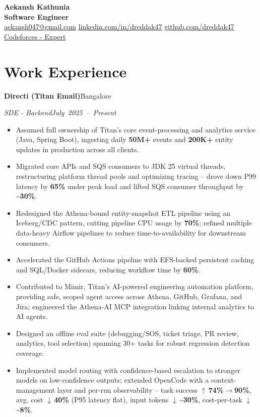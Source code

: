 \documentclass[10pt,letterpaper]{article}
\newcommand{\resumeHeading}[4]{%
  \par\noindent\textbf{#1}\hfill\mbox{#2}\par
  \noindent\textit{#3}\hfill\mbox{\textit{#4}}\par
}
\begin{document}
\begin{center}
  {\LARGE\bfseries Aekansh Kathunia}\\[-1pt]
  \textbf{Software Engineer}\\[1pt]

  \href{mailto:aekansh047@gmail.com}{aekansh047@gmail.com}
  \enspace\textbar\enspace \href{https://www.linkedin.com/in/dreddak47}{linkedin.com/in/dreddak47}
  \enspace\textbar\enspace
  \href{https://github.com/dreddak47}{github.com/dreddak47}
  \enspace\textbar\enspace
  \href{https://codeforces.com/profile/dredd_ak47}{Codeforces - Expert}
\end{center}
\vspace{-10pt}

\section{Work Experience}
\resumeHeading{Directi (Titan Email)}{Bangalore}{SDE - Backend}{July 2025 -- Present}
\begin{itemize}
\item Assumed full ownership of Titan's core event-processing and analytics service (Java, Spring Boot), ingesting daily \textbf{50M+} events and \textbf{200K+} entity updates in production across all clients.
\item Migrated core APIs and SQS consumers to JDK 25 virtual threads, restructuring platform thread pools and optimizing tracing -- drove down P99 latency by \textbf{65\%} under peak load and lifted SQS consumer throughput by \textbf{\textasciitilde 30\%}.
\item Redesigned the Athena-bound entity-snapshot ETL pipeline using an Iceberg/CDC pattern, cutting pipeline CPU usage by \textbf{70\%}; refined multiple data-heavy Airflow pipelines to reduce time-to-availability for downstream consumers.
\item Accelerated the GitHub Actions pipeline with EFS-backed persistent caching and SQL/Docker sidecars, reducing workflow time by \textbf{60\%}.
\item Contributed to Mimir, Titan's AI-powered engineering automation platform, providing safe, scoped agent access across Athena, GitHub, Grafana, and Jira; engineered the Athena-AI MCP integration linking internal analytics to AI agents.
\item Designed an offline eval suite (debugging/SOS, ticket triage, PR review, analytics, tool selection) spanning 30+ tasks for robust regression detection coverage.
\item Implemented model routing with confidence-based escalation to stronger models on low-confidence outputs; extended OpenCode with a context-management layer and per-run observability -- task success $\uparrow$\,\textbf{74\%$\to$90\%}, avg. cost $\downarrow$\,\textbf{40\%} (P95 latency flat), input tokens $\downarrow$\,\textbf{\textasciitilde 30\%}, cost-per-task $\downarrow$\,\textbf{\textasciitilde 8\%}.
\end{itemize}
\end{document}
